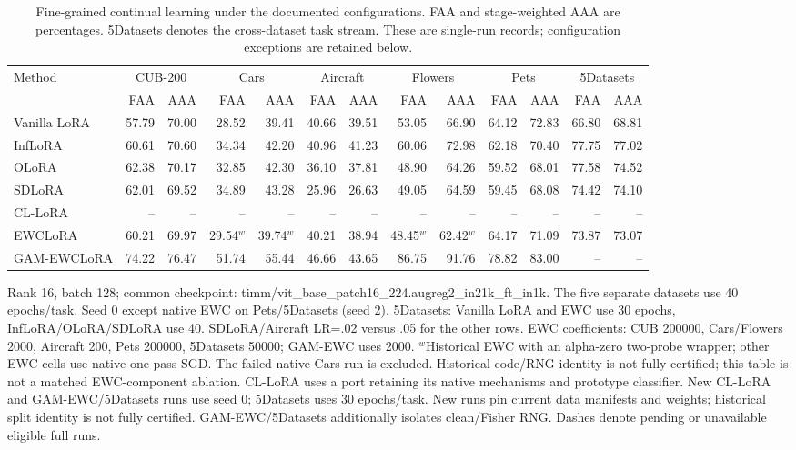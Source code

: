 \begin{table}[t]
\centering
\caption{Fine-grained continual learning under the documented configurations. FAA and stage-weighted AAA are percentages. 5Datasets denotes the cross-dataset task stream. These are single-run records; configuration exceptions are retained below.}
\label{tab:exp_fine}
\scriptsize\setlength{\tabcolsep}{2.2pt}\renewcommand{\arraystretch}{1.08}
\begin{tabular*}{\linewidth}{@{\extracolsep{\fill}}l*{12}{r}@{}}
\toprule
Method & \multicolumn{2}{c}{CUB-200} & \multicolumn{2}{c}{Cars} & \multicolumn{2}{c}{Aircraft} & \multicolumn{2}{c}{Flowers} & \multicolumn{2}{c}{Pets} & \multicolumn{2}{c}{5Datasets}\\
\cmidrule(lr){2-3}\cmidrule(lr){4-5}\cmidrule(lr){6-7}\cmidrule(lr){8-9}\cmidrule(lr){10-11}\cmidrule(lr){12-13}
 & FAA & AAA & FAA & AAA & FAA & AAA & FAA & AAA & FAA & AAA & FAA & AAA\\\midrule
Vanilla LoRA & 57.79 & 70.00 & 28.52 & 39.41 & 40.66 & 39.51 & 53.05 & 66.90 & 64.12 & 72.83 & 66.80 & 68.81\\
InfLoRA & 60.61 & 70.60 & 34.34 & 42.20 & 40.96 & 41.23 & 60.06 & 72.98 & 62.18 & 70.40 & 77.75 & 77.02\\
OLoRA & 62.38 & 70.17 & 32.85 & 42.30 & 36.10 & 37.81 & 48.90 & 64.26 & 59.52 & 68.01 & 77.58 & 74.52\\
SDLoRA & 62.01 & 69.52 & 34.89 & 43.28 & 25.96 & 26.63 & 49.05 & 64.59 & 59.45 & 68.08 & 74.42 & 74.10\\
CL-LoRA & -- & -- & -- & -- & -- & -- & -- & -- & -- & -- & -- & --\\
EWCLoRA & 60.21 & 69.97 & 29.54$^{w}$ & 39.74$^{w}$ & 40.21 & 38.94 & 48.45$^{w}$ & 62.42$^{w}$ & 64.17 & 71.09 & 73.87 & 73.07\\
GAM-EWCLoRA & 74.22 & 76.47 & 51.74 & 55.44 & 46.66 & 43.65 & 86.75 & 91.76 & 78.82 & 83.00 & -- & --\\
\bottomrule\end{tabular*}
\par\vspace{3pt}\begin{minipage}{\linewidth}\scriptsize
Rank 16, batch 128; common checkpoint: timm/vit\_base\_patch16\_224.augreg2\_in21k\_ft\_in1k. The five separate datasets use 40 epochs/task. Seed 0 except native EWC on Pets/5Datasets (seed 2). 5Datasets: Vanilla LoRA and EWC use 30 epochs, InfLoRA/OLoRA/SDLoRA use 40. SDLoRA/Aircraft LR=.02 versus .05 for the other rows. EWC coefficients: CUB 200000, Cars/Flowers 2000, Aircraft 200, Pets 200000, 5Datasets 50000; GAM-EWC uses 2000. $^{w}$Historical EWC with an alpha-zero two-probe wrapper; other EWC cells use native one-pass SGD. The failed native Cars run is excluded. Historical code/RNG identity is not fully certified; this table is not a matched EWC-component ablation. CL-LoRA uses a port retaining its native mechanisms and prototype classifier. New CL-LoRA and GAM-EWC/5Datasets runs use seed 0; 5Datasets uses 30 epochs/task. New runs pin current data manifests and weights; historical split identity is not fully certified. GAM-EWC/5Datasets additionally isolates clean/Fisher RNG. Dashes denote pending or unavailable eligible full runs.
\end{minipage}
\end{table}

